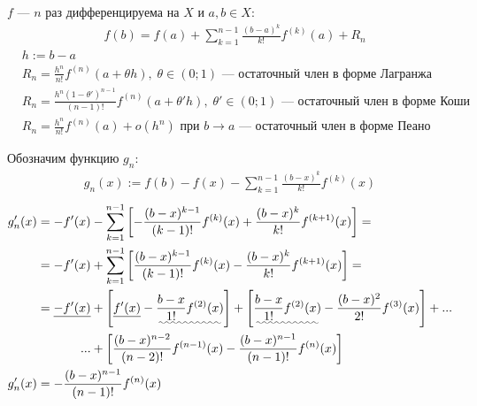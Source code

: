 \documentclass{article}
\begin{document}


$f$ --- $n$ раз дифференцируема на $X$ и $a,b\in X$:
\begin{align}
	 & f(b)=f(a)+\sum_{k=1}^{n-1}\frac{(b-a)^{k}}{k!}f^{(k)}(a)+R_n\label{56:formula}
\end{align}
\begin{align*}
	 & h:=b-a                                                                                                                  \\
	 & R_n=\frac{h^n}{n!}f^{(n)}(a+\theta h),\;\theta\in(0;1)\text{ --- остаточный член в форме Лагранжа }                     \\
	 & R_n=\frac{h^{n}(1-\theta')^{n-1}}{(n-1)!}f^{(n)}(a+\theta'h),\;\theta'\in(0;1)\text{ --- остаточный член в форме Коши } \\
	 & R_n=\frac{h^{n}}{n!}f^{(n)}(a)+o(h^{n})\text{ при $b\to a$ --- остаточный член в форме Пеано }
\end{align*}

\proof

Обозначим функцию $g_n$:
\begin{align*}
	g_n(x):=f(b)-f(x)-\sum_{k=1}^{n-1}\frac{(b-x)^{k}}{k!}f^{(k)}(x)
\end{align*}
\begin{align*}
	g_n'(x)
	 & =-f'(x)-\sum_{k=1}^{n-1}\left[-\frac{(b-x)^{k-1}}{(k-1)!}f^{(k)}(x)+\frac{(b-x)^{k}}{k!}f^{(k+1)}(x)\right]=                                                                                                                          \\
	 & =-f'(x)+\sum_{k=1}^{n-1}\left[\frac{(b-x)^{k-1}}{(k-1)!}f^{(k)}(x)-\frac{(b-x)^{k}}{k!}f^{(k+1)}(x)\right]=                                                                                                                           \\
	 & =
	\begin{aligned}[t]
		\underline{-f'(x)} & +\left[\underline{f'(x)}-\uwave{\frac{b-x}{1!}f^{(2)}(x)}\right]+\left[\uwave{\frac{b-x}{1!}f^{(2)}(x)}-\frac{(b-x)^{2}}{2!}f^{(3)}(x)\right]+... \\
		...                & +\left[\frac{(b-x)^{n-2}}{(n-2)!}f^{(n-1)}(x)-\frac{(b-x)^{n-1}}{(n-1)!}f^{(n)}(x)\right]
	\end{aligned} \\
	g_n'(x)
	 & =-\frac{(b-x)^{n-1}}{(n-1)!}f^{(n)}(x)
\end{align*}
\end{document}
